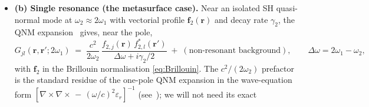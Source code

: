 \documentclass[11pt,a4paper]{article}
\newcommand{\eps}{\varepsilon}
\newcommand{\bvec}[1]{\mathbf{#1}}
\newcommand{\f}{\bvec{f}}
\newcommand{\ri}{\bvec{r}}
\newcommand{\chitwo}{\chi^{(2)}}
\newcommand{\chithree}{\chi^{(3)}}
\newcommand{\Dom}{\Delta\omega}
\begin{document}
\begin{itemize}
    gives $\chithree_\text{casc}=K_\text{casc}\,2n_1c/(3\omega_1)$; the
    explicit $n_1$ from the FM projection cancels against the $n_1$ in
    $K_\text{casc}$, leaving only the SH refractive index:
    \begin{equation}
      \boxed{\;\chithree_{\text{casc,\,bulk}}(\omega_1)
              \;=\;-\,\frac{2\,\omega_1}{3\,c\,n_2\,\Delta k}\;
                   |\chitwo|^{2}\,\mathcal{F}(\Delta k\,L),\;}
      \label{eq:chi3casc-bulk}
    \end{equation}
    with $\mathcal{F}(\Delta k L)$ a dimensionless phase factor that
    averages to $\mathcal{F}\!\to\!1$ for $\Delta k L\!\gg\!1$
    (broadband bulk cascading; the regime exploited in soliton
    compression) and to $\mathcal{F}\!\to\!\Delta k L/2$ for
    $\Delta k L\!\ll\!1$ (where SHG conversion competes with the
    cascade).  Dimensionally $[\omega_1/(c\,\Delta k)]$ is dimensionless
    and $[|\chitwo|^{2}/n_2]=\mathrm{m}^{2}/\mathrm{V}^{2}$ as required;
    the explicit factor $2/3$ is the DFG-to-SPM Boyd degeneracy ratio
    inherited from \eqref{eq:Pcasc-nonlocal}.  Note that only $n_2$
    (the SH-mode index) survives in the end, paralleling the metasurface
    result \eqref{eq:chi3casc_explicit} below.  The
    cascaded contribution is sign-tunable through $\mathrm{sign}(\Delta k)$
    and bounded by the coherence length $\pi/\Delta k$ over which the
    cascade builds up coherently before reversing.  Equation
    \eqref{eq:chi3casc-bulk} is used in Section~\ref{sec:numerical} to
    estimate the bulk PPLN cascaded $\chithree$ for LiNbO$_3$.
  \item \textbf{(b) Single resonance (the metasurface case).}  Near an
    isolated SH quasi-normal mode at $\omega_2\approx 2\omega_1$ with
    vectorial profile $\f_2(\ri)$ and decay rate $\gamma_2$, the QNM
    expansion~\cite{Kristensen2020,Sauvan2013,Lalanne2018} gives, near
    the pole,
    \begin{equation}
      G_{jl}(\ri,\ri';2\omega_1)\;=\;
      \frac{c^2}{2\omega_2}\,
      \frac{f_{2,j}(\ri)\,f_{2,l}^*(\ri')}{\Dom+i\gamma_2/2}
      \;+\;(\text{non-resonant background}),
      \qquad\Dom=2\omega_1-\omega_2,
    \label{eq:G-QNM}
    \end{equation}
    with $\f_2$ in the Brillouin normalisation \eqref{eq:Brillouin}.
    The $c^2/(2\omega_2)$ prefactor is the standard residue of the
    one-pole QNM expansion in the wave-equation form
    $[\nabla\!\times\!\nabla\!\times\,-\,(\omega/c)^{2}\eps_r]^{-1}$
    (see~\cite[Eq.~(31)]{Sauvan2013}); we will not need its exact

\end{itemize}
\end{document}
